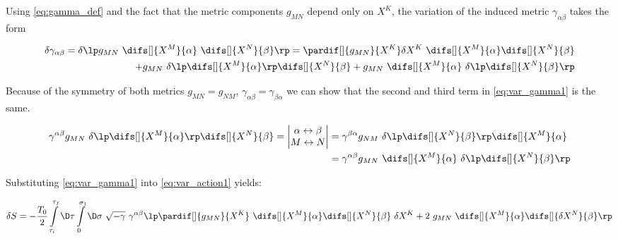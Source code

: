 \noindent
Using \cref{eq:gamma_def} and the fact that the metric components $g_{M N}$ depend only on $X^K$, the variation of the induced metric $\gamma_{\alpha \beta}$ takes the form

\begin{equation}
\label{eq:var_gamma1}
    \begin{aligned}
        \delta \gamma_{\alpha \beta} = \delta \lp g_{M N}~ \difs[] {X^{M}} {\alpha} ~ \difs[] {X^{N}} {\beta} \rp = \pardif[] {g_{M N}} {X^{K}} \delta X^{K} ~ \difs[] {X^{M}} {\alpha} \difs[] {X^{N}} {\beta} \\
        + g_{M N} ~ \delta \lp \difs[] {X^{M}} {\alpha}\rp \difs[] {X^{N}} {\beta} + g_{M N} ~ \difs[] {X^{M}} {\alpha} ~ \delta \lp \difs[] {X^{N}} {\beta} \rp
    \end{aligned}
\end{equation}

\noindent
Because of the symmetry of both metrics $g_{M N} = g_{N M}$, $\gamma_{\alpha \beta} = \gamma_{\beta \alpha}$ we can show that the second and third term in \cref{eq:var_gamma1} is the same.

\begin{equation}
    \begin{aligned}
        \gamma^{\alpha \beta} g_{M N} ~ \delta \lp \difs[] {X^{M}} {\alpha}\rp \difs[] {X^{N}} {\beta} = 
        \begin{vmatrix}{\alpha \leftrightarrow \beta} \\ {M \leftrightarrow N} \end{vmatrix}
        & = \gamma^{\beta \alpha} g_{N M} ~ \delta \lp \difs[] {X^{N}} {\beta}\rp \difs[] {X^{M}} {\alpha}  \\
        & = \gamma^{\alpha \beta} g_{M N} ~ \difs[] {X^{M}} {\alpha} ~ \delta \lp \difs[] {X^{N}} {\beta}\rp 
    \end{aligned}
\end{equation}

\noindent
Substituting \cref{eq:var_gamma1} into \cref{eq:var_action1} yields:

\begin{equation}
\label{eq:gen_s_before_perpartes}
    \begin{aligned}
        \delta S = - \frac{T_0}{2} \int\limits_{\tau_i}^{\tau_f} \D \tau \int\limits_{0}^{\sigma_1} \D \sigma ~
        \sqrt{-\gamma} ~\gamma^{\alpha \beta} \lp \pardif[] {g_{M N}} {X^{K}} ~ \difs[] {X^{M}} {\alpha} \difs[] {X^{N}} {\beta} ~ \delta X^{K} + 2 ~ g_{M N} ~ \difs[] {X^{M}} {\alpha} \difs[] {\delta X^{N}} {\beta} \rp
    \end{aligned}
\end{equation}

